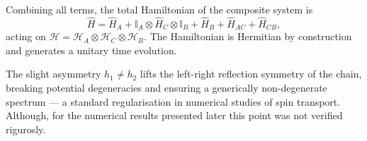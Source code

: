 \documentclass[12pt,a4paper]{article}
\newcommand{\Ham}{\hat{H}}
\newcommand{\Hilb}{\mathcal{H}}
\begin{document}
Combining all terms, the total Hamiltonian of the composite system is
\begin{equation}
  \boxed{
    \Ham = \Ham_A + \mathbb{I}_A\otimes\Ham_C\otimes\mathbb{I}_B + \Ham_B
           + \Ham_{AC} + \Ham_{CB},
  }
  \label{eq:Htotal}
\end{equation}
acting on $\Hilb = \Hilb_A\otimes\Hilb_C\otimes\Hilb_B$.  The Hamiltonian is
Hermitian by construction and generates a unitary time evolution.



The slight asymmetry $h_1 \neq h_2$ lifts the left-right reflection symmetry of
the chain, breaking potential degeneracies and ensuring a generically non-degenerate spectrum — a standard regularisation in numerical studies of spin transport. Although, for the numerical results presented later this point was not verified rigurosly.
\end{document}
